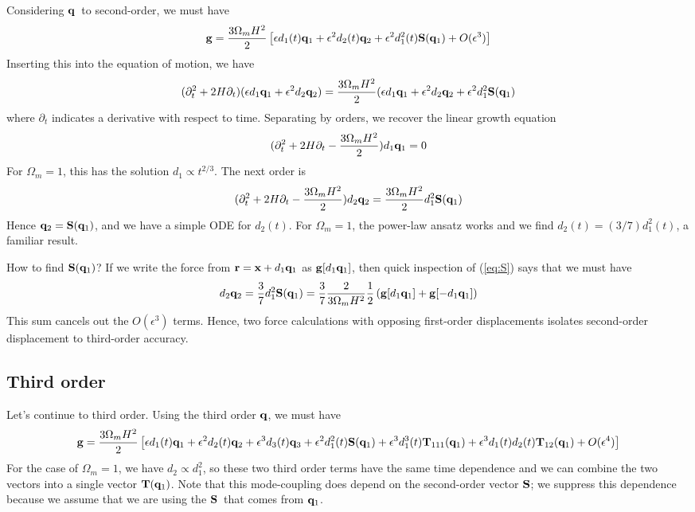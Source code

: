 \documentclass[11pt,preprint]{aastex}
\newcommand{\beq}{\begin{equation}}
\newcommand{\eeq}{\end{equation}}
\newcommand{\bfr}{\ensuremath{{\bf r}}}
\newcommand{\bfg}{\ensuremath{{\bf g}}}
\newcommand{\bfx}{\ensuremath{{\bf x}}}
\newcommand{\bfq}{\ensuremath{{\bf q}}}
\newcommand{\bfS}{\ensuremath{{\bf S}}}
\newcommand{\bfT}{\ensuremath{{\bf T}}}
\begin{document}
Considering \bfq\ to second-order, we must have
\beq\label{eq:S}
\bfg = {3\Omega_m H^2\over 2} \left[ \epsilon d_1(t) \bfq_1
	+ \epsilon^2 d_2(t) \bfq_2
	+ \epsilon^2 d_1^2(t) \bfS(\bfq_1)
	+ O(\epsilon^3)\right]
\eeq
Inserting this into the equation of motion, we have
\beq
(\partial_t^2 + 2H\partial_t) (\epsilon d_1 \bfq_1 + \epsilon^2 d_2 \bfq_2)
= {3\Omega_m H^2\over 2} ( \epsilon d_1 \bfq_1 + \epsilon^2 d_2 \bfq_2
	+ \epsilon^2 d_1^2 \bfS(\bfq_1)
\eeq
where $\partial_t$ indicates a derivative with respect to time.
Separating by orders, we recover the linear growth equation
\beq
(\partial_t^2 + 2H\partial_t - {3\Omega_m H^2\over 2}) d_1 \bfq_1 = 0
\eeq
For $\Omega_m = 1$, this has the solution $d_1\propto t^{2/3}$.
The next order is
\beq
(\partial_t^2 + 2H\partial_t - {3\Omega_m H^2\over 2}) d_2 \bfq_2 = 
	{3\Omega_m H^2\over 2} d_1^2 \bfS(\bfq_1)
\eeq
Hence $\bfq_2 = \bfS(\bfq_1)$, and we have a simple ODE for $d_2(t)$.
For $\Omega_m = 1$, the power-law ansatz works and 
we find $d_2(t) = (3/7) d_1^2(t)$, a familiar result.

How to find $\bfS(\bfq_1)$?  If we write the force from
$\bfr = \bfx+d_1 \bfq_1$ as $\bfg[d_1\bfq_1]$, then quick inspection of
(\ref{eq:S}) says that we must have
\beq
d_2 \bfq_2 = {3\over 7} d_1^2 \bfS(\bfq_1) = {3\over 7} {2\over 3\Omega_m H^2} {1\over 2}
	\left( \bfg[d_1\bfq_1] + \bfg[-d_1\bfq_1] \right)
\eeq 
This sum cancels out the $O(\epsilon^3)$ terms.
Hence, two force calculations with opposing first-order displacements isolates
second-order displacement to third-order accuracy.

\subsection{Third order}

Let's continue to third order.  Using the third order \bfq, we must
have
\beq\label{eq:T}
\bfg = {3\Omega_m H^2\over 2} \left[ \epsilon d_1(t) \bfq_1
	+ \epsilon^2 d_2(t) \bfq_2
	+ \epsilon^3 d_3(t) \bfq_3
	+ \epsilon^2 d_1^2(t) \bfS(\bfq_1)
	+ \epsilon^3 d_1^3(t) \bfT_{111}(\bfq_1)
	+ \epsilon^3 d_1(t) d_2(t) \bfT_{12}(\bfq_1)
	+ O(\epsilon^4)\right]
\eeq
For the case of $\Omega_m=1$, we have $d_2\propto d_1^2$, so these
two third order terms have the same time dependence and we can combine
the two vectors into a single vector $\bfT(\bfq_1)$.  Note that this
mode-coupling does depend on the second-order vector \bfS; we suppress
this dependence because we assume that we are using the \bfS\ that comes
from $\bfq_1$.  
\end{document}

